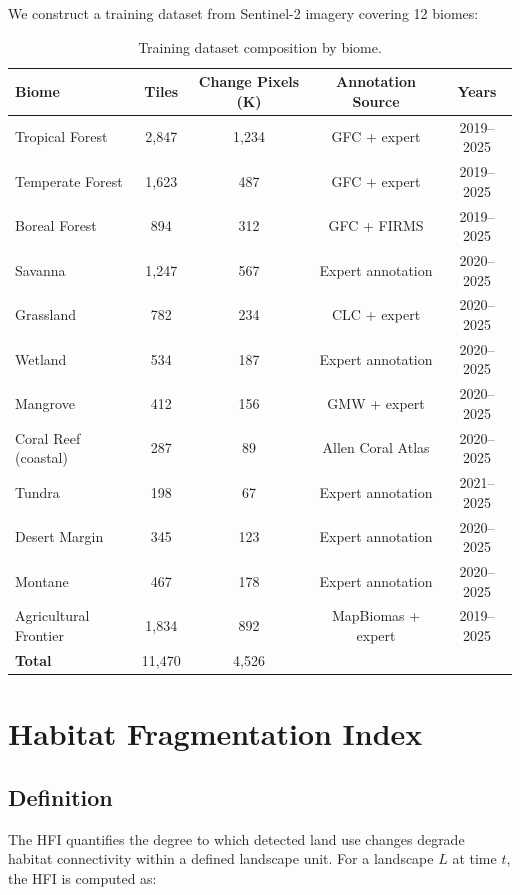 \documentclass[11pt,a4paper]{article}
\begin{document}
We construct a training dataset from Sentinel-2 imagery covering 12 biomes:

\begin{table}[H]
\centering
\caption{Training dataset composition by biome.}
\label{tab:training_data}
\begin{tabular}{@{}lcccc@{}}
\toprule
\textbf{Biome} & \textbf{Tiles} & \textbf{Change Pixels (K)} & \textbf{Annotation Source} & \textbf{Years} \\
\midrule
Tropical Forest & 2,847 & 1,234 & GFC + expert & 2019--2025 \\
Temperate Forest & 1,623 & 487 & GFC + expert & 2019--2025 \\
Boreal Forest & 894 & 312 & GFC + FIRMS & 2019--2025 \\
Savanna & 1,247 & 567 & Expert annotation & 2020--2025 \\
Grassland & 782 & 234 & CLC + expert & 2020--2025 \\
Wetland & 534 & 187 & Expert annotation & 2020--2025 \\
Mangrove & 412 & 156 & GMW + expert & 2020--2025 \\
Coral Reef (coastal) & 287 & 89 & Allen Coral Atlas & 2020--2025 \\
Tundra & 198 & 67 & Expert annotation & 2021--2025 \\
Desert Margin & 345 & 123 & Expert annotation & 2020--2025 \\
Montane & 467 & 178 & Expert annotation & 2020--2025 \\
Agricultural Frontier & 1,834 & 892 & MapBiomas + expert & 2019--2025 \\
\midrule
\textbf{Total} & 11,470 & 4,526 & & \\
\bottomrule
\end{tabular}
\end{table}

\section{Habitat Fragmentation Index}
\label{sec:fragmentation}

\subsection{Definition}

The HFI quantifies the degree to which detected land use changes degrade habitat connectivity within a defined landscape unit.
For a landscape $L$ at time $t$, the HFI is computed as:
\end{document}
